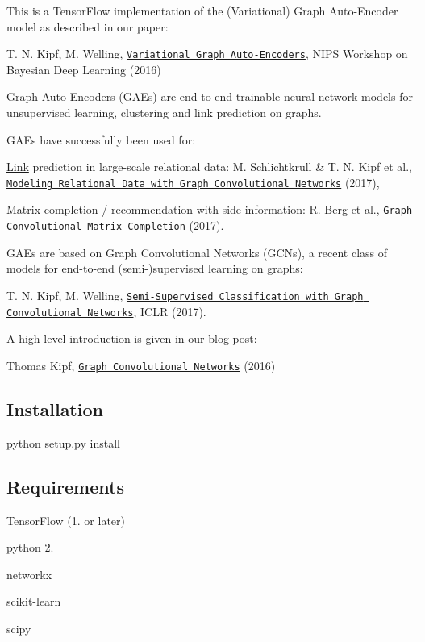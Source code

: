 This is a Tensor\+Flow implementation of the (Variational) Graph Auto-\/\+Encoder model as described in our paper\+:

T. N. Kipf, M. Welling, \href{https://arxiv.org/abs/1611.07308}{\tt Variational Graph Auto-\/\+Encoders}, N\+I\+PS Workshop on Bayesian Deep Learning (2016)

Graph Auto-\/\+Encoders (G\+A\+Es) are end-\/to-\/end trainable neural network models for unsupervised learning, clustering and link prediction on graphs.



G\+A\+Es have successfully been used for\+:
\begin{DoxyItemize}
\item \mbox{\hyperlink{structLink}{Link}} prediction in large-\/scale relational data\+: M. Schlichtkrull \& T. N. Kipf et al., \href{https://arxiv.org/abs/1703.06103}{\tt Modeling Relational Data with Graph Convolutional Networks} (2017),
\item Matrix completion / recommendation with side information\+: R. Berg et al., \href{https://arxiv.org/abs/1706.02263}{\tt Graph Convolutional Matrix Completion} (2017).
\end{DoxyItemize}

G\+A\+Es are based on Graph Convolutional Networks (G\+C\+Ns), a recent class of models for end-\/to-\/end (semi-\/)supervised learning on graphs\+:

T. N. Kipf, M. Welling, \href{https://arxiv.org/abs/1609.02907}{\tt Semi-\/\+Supervised Classification with Graph Convolutional Networks}, I\+C\+LR (2017).

A high-\/level introduction is given in our blog post\+:

Thomas Kipf, \href{http://tkipf.github.io/graph-convolutional-networks/}{\tt Graph Convolutional Networks} (2016)

\subsection*{Installation}


\begin{DoxyCode}
python setup.py install
\end{DoxyCode}


\subsection*{Requirements}


\begin{DoxyItemize}
\item Tensor\+Flow (1. or later)
\item python 2.
\item networkx
\item scikit-\/learn
\item scipy
\end{DoxyItemize}

